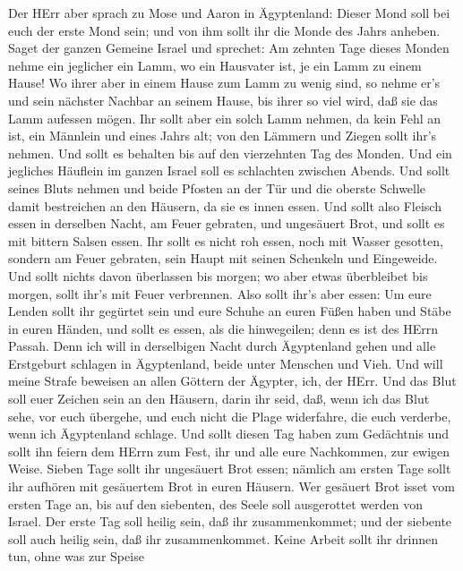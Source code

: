  Der HErr aber sprach zu Mose und Aaron in Ägyptenland:
 Dieser Mond soll bei euch der erste Mond sein; und von ihm
sollt ihr die Monde des Jahrs anheben.  Saget der ganzen
Gemeine Israel und sprechet: Am zehnten Tage dieses Monden nehme ein
jeglicher ein Lamm, wo ein Hausvater ist, je ein Lamm zu einem Hause!
 Wo ihrer aber in einem Hause zum Lamm zu wenig sind, so
nehme er's und sein nächster Nachbar an seinem Hause, bis ihrer so viel
wird, daß sie das Lamm aufessen mögen.  Ihr sollt aber ein
solch Lamm nehmen, da kein Fehl an ist, ein Männlein und eines Jahrs
alt; von den Lämmern und Ziegen sollt ihr's nehmen.  Und
sollt es behalten bis auf den vierzehnten Tag des Monden. Und ein
jegliches Häuflein im ganzen Israel soll es schlachten zwischen Abends.
 Und sollt seines Bluts nehmen und beide Pfosten an der Tür
und die oberste Schwelle damit bestreichen an den Häusern, da sie es
innen essen.  Und sollt also Fleisch essen in derselben
Nacht, am Feuer gebraten, und ungesäuert Brot, und sollt es mit bittern
Salsen essen.  Ihr sollt es nicht roh essen, noch mit Wasser
gesotten, sondern am Feuer gebraten, sein Haupt mit seinen Schenkeln und
Eingeweide.  Und sollt nichts davon überlassen bis morgen;
wo aber etwas überbleibet bis morgen, sollt ihr's mit Feuer verbrennen.
 Also sollt ihr's aber essen: Um eure Lenden sollt ihr
gegürtet sein und eure Schuhe an euren Füßen haben und Stäbe in euren
Händen, und sollt es essen, als die hinwegeilen; denn es ist des HErrn
Passah.  Denn ich will in derselbigen Nacht durch
Ägyptenland gehen und alle Erstgeburt schlagen in Ägyptenland, beide
unter Menschen und Vieh. Und will meine Strafe beweisen an allen Göttern
der Ägypter, ich, der HErr.  Und das Blut soll euer Zeichen
sein an den Häusern, darin ihr seid, daß, wenn ich das Blut sehe, vor
euch übergehe, und euch nicht die Plage widerfahre, die euch verderbe,
wenn ich Ägyptenland schlage.  Und sollt diesen Tag haben
zum Gedächtnis und sollt ihn feiern dem HErrn zum Fest, ihr und alle
eure Nachkommen, zur ewigen Weise.  Sieben Tage sollt ihr
ungesäuert Brot essen; nämlich am ersten Tage sollt ihr aufhören mit
gesäuertem Brot in euren Häusern. Wer gesäuert Brot isset vom ersten
Tage an, bis auf den siebenten, des Seele soll ausgerottet werden von
Israel.  Der erste Tag soll heilig sein, daß ihr
zusammenkommet; und der siebente soll auch heilig sein, daß ihr
zusammenkommet. Keine Arbeit sollt ihr drinnen tun, ohne was zur Speise
